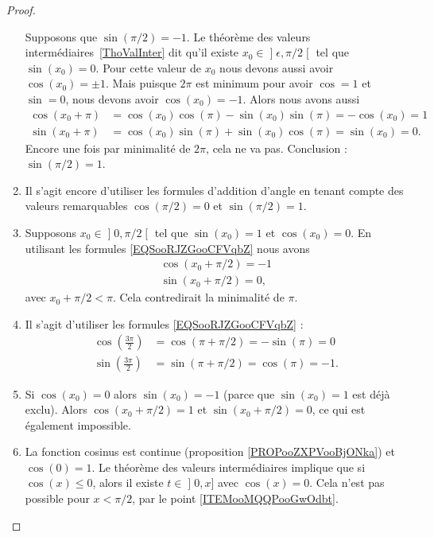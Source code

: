 \begin{proof}
\begin{enumerate}
			      Supposons que \( \sin(\pi/2)=-1\). Le théorème des valeurs intermédiaires~\ref{ThoValInter} dit qu'il existe \( x_0\in\mathopen] \epsilon , \pi/2 \mathclose[\) tel que \( \sin(x_0)=0\). Pour cette valeur de \( x_0\) nous devons aussi avoir \( \cos(x_0)=\pm 1\). Mais puisque \( 2\pi\) est minimum pour avoir \( \cos=1\) et \( \sin=0\), nous devons avoir \( \cos(x_0)=-1\). Alors nous avons aussi
		      \begin{subequations}
			      \begin{align}
				      \cos(x_0+\pi) & =\cos(x_0)\cos(\pi)-\sin(x_0)\sin(\pi)  =-\cos(x_0)   =1    \\
				      \sin(x_0+\pi) & =\cos(x_0)\sin(\pi)+\sin(x_0)\cos(\pi)  = \sin(x_0)   =0.
			      \end{align}
		      \end{subequations}
		      Encore une fois par minimalité de \( 2\pi\), cela ne va pas. Conclusion : \( \sin(\pi/2)=1\).
		\item
		      Il s'agit encore d'utiliser les formules d'addition d'angle en tenant compte des valeurs remarquables \( \cos(\pi/2)=0\) et \( \sin(\pi/2)=1\).
		\item
		      Supposons \( x_0\in\mathopen] 0 , \pi/2 \mathclose[\) tel que \( \sin(x_0)=1\) et \( \cos(x_0)=0\). En utilisant les formules \eqref{EQSooRJZGooCFVqbZ} nous avons
		      \begin{subequations}
			      \begin{align}
				      \cos(x_0+\pi/2)=-1 \\
				      \sin(x_0+\pi/2)=0,
			      \end{align}
		      \end{subequations}
		      avec \( x_0+\pi/2<\pi\). Cela contredirait la minimalité de \( \pi\).
		\item
		      Il s'agit d'utiliser les formules \eqref{EQSooRJZGooCFVqbZ} :
		      \begin{subequations}
			      \begin{align}
				      \cos(\frac{ 3\pi }{ 2 })  & =\cos(\pi+\pi/2)   =-\sin(\pi) =0     \\
				      \sin(\frac{ 3\pi }{ 2 })  & =\sin(\pi+\pi/2)   = \cos(\pi) =-1.
			      \end{align}
		      \end{subequations}
		\item
		      Si \( \cos(x_0)=0\) alors \( \sin(x_0)=-1\) (parce que \( \sin(x_0)=1\) est déjà exclu). Alors \( \cos(x_0+\pi/2)=1\) et \( \sin(x_0+\pi/2)=0\), ce qui est également impossible.
		\item
		      La fonction cosinus est continue (proposition \ref{PROPooZXPVooBjONka}) et \( \cos(0)=1\). Le théorème des valeurs intermédiaires implique que si \( \cos(x)\leq 0\), alors il existe \( t\in \mathopen] 0 , x \mathclose]\) avec \( \cos(x)=0\). Cela n'est pas possible pour \( x<\pi/2\), par le point \ref{ITEMooMQQPooGwOdbt}.


\end{enumerate}
\end{proof}
